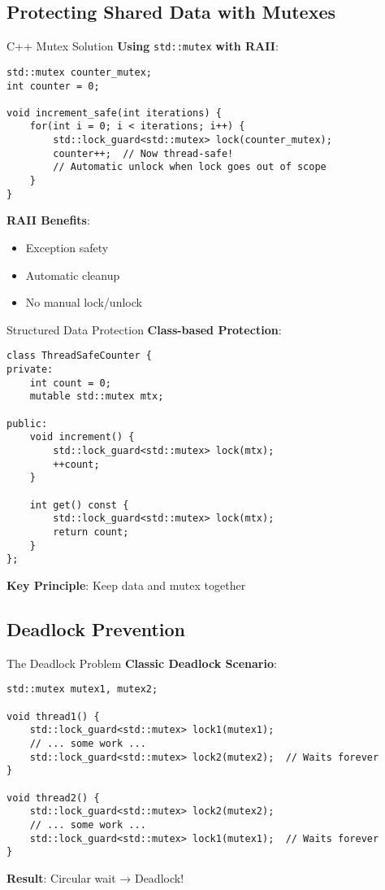 \subsection{Protecting Shared Data with Mutexes}
\begin{frame}[fragile]{C++ Mutex Solution}
	\textbf{Using} \texttt{std::mutex} \textbf{with RAII}:

	\begin{verbatim}
std::mutex counter_mutex;
int counter = 0;

void increment_safe(int iterations) {
    for(int i = 0; i < iterations; i++) {
        std::lock_guard<std::mutex> lock(counter_mutex);
        counter++;  // Now thread-safe!
        // Automatic unlock when lock goes out of scope
    }
}
	\end{verbatim}

	\textbf{RAII Benefits}:
	\begin{itemize}
		\item Exception safety
		\item Automatic cleanup
		\item No manual lock/unlock
	\end{itemize}
\end{frame}

\begin{frame}[fragile]{Structured Data Protection}
	\textbf{Class-based Protection}:

	\begin{verbatim}
class ThreadSafeCounter {
private:
    int count = 0;
    mutable std::mutex mtx;

public:
    void increment() {
        std::lock_guard<std::mutex> lock(mtx);
        ++count;
    }

    int get() const {
        std::lock_guard<std::mutex> lock(mtx);
        return count;
    }
};
	\end{verbatim}

	\textbf{Key Principle}: Keep data and mutex together
\end{frame}

\subsection{Deadlock Prevention}
\begin{frame}[fragile]{The Deadlock Problem}
	\textbf{Classic Deadlock Scenario}:

	\begin{verbatim}
std::mutex mutex1, mutex2;

void thread1() {
    std::lock_guard<std::mutex> lock1(mutex1);
    // ... some work ...
    std::lock_guard<std::mutex> lock2(mutex2);  // Waits forever
}

void thread2() {
    std::lock_guard<std::mutex> lock2(mutex2);
    // ... some work ...
    std::lock_guard<std::mutex> lock1(mutex1);  // Waits forever
}
	\end{verbatim}

	\textbf{Result}: Circular wait → Deadlock!
\end{frame}

